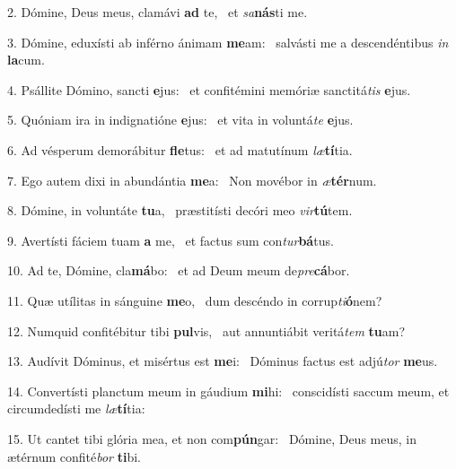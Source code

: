 2. Dómine, Deus meus, clamávi \textbf{ad} te, \ast\  et \textit{sa}\textbf{nás}ti me.\

3. Dómine, eduxísti ab inférno ánimam \textbf{me}am: \ast\  salvásti me a descendéntibus \textit{in} \textbf{la}cum.\

4. Psállite Dómino, sancti \textbf{e}jus: \ast\  et confitémini memóriæ sanctitá\textit{tis} \textbf{e}jus.\

5. Quóniam ira in indignatióne \textbf{e}jus: \ast\  et vita in voluntá\textit{te} \textbf{e}jus.\

6. Ad vésperum demorábitur \textbf{fle}tus: \ast\  et ad matutínum \textit{læ}\textbf{tí}tia.\

7. Ego autem dixi in abundántia \textbf{me}a: \ast\  Non movébor in \textit{æ}\textbf{tér}num.\

8. Dómine, in voluntáte \textbf{tu}a, \ast\  præstitísti decóri meo \textit{vir}\textbf{tú}tem.\

9. Avertísti fáciem tuam \textbf{a} me, \ast\  et factus sum con\textit{tur}\textbf{bá}tus.\

10. Ad te, Dómine, cla\textbf{má}bo: \ast\  et ad Deum meum de\textit{pre}\textbf{cá}bor.\

11. Quæ utílitas in sánguine \textbf{me}o, \ast\  dum descéndo in corrup\textit{ti}\textbf{ó}nem?\

12. Numquid confitébitur tibi \textbf{pul}vis, \ast\  aut annuntiábit veritá\textit{tem} \textbf{tu}am?\

13. Audívit Dóminus, et misértus est \textbf{me}i: \ast\  Dóminus factus est adjú\textit{tor} \textbf{me}us.\

14. Convertísti planctum meum in gáudium \textbf{mi}hi: \ast\  conscidísti saccum meum, et circumdedísti me \textit{læ}\textbf{tí}tia:\

15. Ut cantet tibi glória mea, et non com\textbf{pún}gar: \ast\  Dómine, Deus meus, in ætérnum confité\textit{bor} \textbf{ti}bi.\

